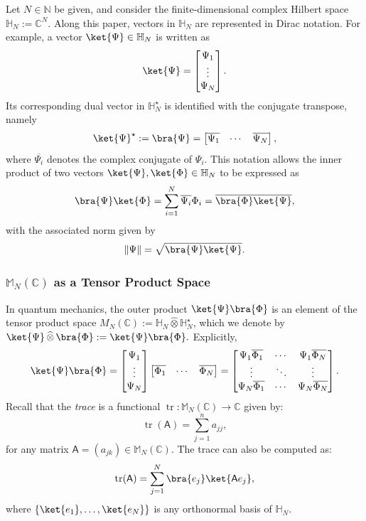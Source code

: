 \documentclass[a4paper,11pt]{article}
\newcommand{\rA}{\mathsf{A}}
\begin{document}
Let \( N \in \mathbb{N} \) be given, and consider the finite-dimensional complex Hilbert space
$\mathbb{H}_N := \mathbb{C}^N.$ Along this paper, vectors in \(\mathbb{H}_N\) are represented in Dirac notation. For example, a vector \(\ket{\Psi} \in \mathbb{H}_N\) is written as
\[
\ket{\Psi} = \begin{bmatrix} \Psi_1 \\ \vdots \\ \Psi_N \end{bmatrix}.
\]
Its corresponding dual vector in \(\mathbb{H}_N^{\star}\) is identified with the conjugate transpose, namely
\[
\ket{\Psi}^{\star} := \bra{\Psi} = \begin{bmatrix} \overline{\Psi_1} & \cdots & \overline{\Psi_N} \end{bmatrix},
\]
where \(\overline{\Psi_i}\) denotes the complex conjugate of \(\Psi_i\). This notation allows the inner product of two vectors \(\ket{\Psi}, \ket{\Phi} \in \mathbb{H}_N\) to be expressed as
\[
\bra{\Psi}\ket{\Phi} = \sum_{i=1}^{N} \overline{\Psi_i}\Phi_i = \overline{\bra{\Phi}\ket{\Psi}},
\]
with the associated norm given by
\[
\|\Psi\| = \sqrt{\bra{\Psi}\ket{\Psi}}.
\]

\subsubsection{\(\mathbb{M}_N(\mathbb{C})\) as a Tensor Product Space}

In quantum mechanics, the outer product \(\ket{\Psi}\bra{\Phi}\) is an element of the tensor product space \(M_N(\mathbb{C}):=\mathbb{H}_N \widehat{\otimes} \mathbb{H}_N^{\star}\), which we denote by
\(
\ket{\Psi}\,\widehat{\otimes}\,\bra{\Phi} := \ket{\Psi}\bra{\Phi}.
\)
Explicitly,
\[
\ket{\Psi}\bra{\Phi} = \begin{bmatrix} \Psi_1 \\ \vdots \\ \Psi_N \end{bmatrix}
\begin{bmatrix} \overline{\Phi_1} & \cdots & \overline{\Phi_N} \end{bmatrix}
= \begin{bmatrix}
\Psi_1\overline{\Phi_1} & \cdots & \Psi_1\overline{\Phi_N} \\
\vdots & \ddots & \vdots \\
\Psi_N\overline{\Phi_1} & \cdots & \Psi_N\overline{\Phi_N}
\end{bmatrix}.
\]
Recall that
the \emph{trace} is a functional $\operatorname{tr}: \mathbb{M}_N(\mathbb{C}) \to \mathbb{C}$ given by:
\begin{equation}
    \operatorname{tr}(\rA) = \sum_{j=1}^{n} a_{jj},
\end{equation}
for any matrix $\rA = (a_{jk}) \in \mathbb{M}
_N(\mathbb{C})$. The trace can also be computed as:
\begin{equation}
    \operatorname{tr}(\rA) =\sum_{j=1}^{N} \bra{e_j} \ket{\rA e_j},
\end{equation}
where $\{\ket{e_1}, \dots, \ket{e_N}\}$ is any orthonormal basis of $\mathbb{H}_N$.
\end{document}
